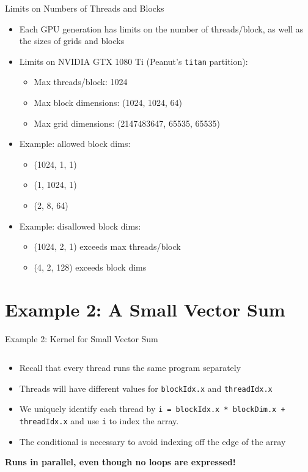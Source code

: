 \documentclass{beamer}
\begin{document}
    \begin{frame}{Limits on Numbers of Threads and Blocks}
        \begin{itemize}
            \item Each GPU generation has limits on the number of threads/block, as well as the sizes of grids and blocks
            \item  Limits on NVIDIA GTX 1080 Ti (Peanut's \texttt{titan} partition):
            \begin{itemize}
                \item Max threads/block: 1024
                \item Max block dimensions:  (1024, 1024, 64)
                \item Max grid dimensions: (2147483647, 65535, 65535)
            \end{itemize}
            \item Example: allowed block dims:
            \begin{itemize}
                \item (1024, 1, 1)
                \item (1, 1024, 1)
                \item (2, 8, 64)
            \end{itemize}
            \item Example: disallowed block dims:
            \begin{itemize}
                \item (1024, 2, 1) exceeds max threads/block
                \item (4, 2, 128) exceeds block dims
            \end{itemize}
        \end{itemize}
    \end{frame}

    \section{Example 2:  A Small Vector Sum}

    \begin{frame}{Example 2:  Kernel for Small Vector Sum}
        \begin{block}{}
            \inputminted[firstline=6,lastline=11]{cuda}{src/02_vector_add.cu}
        \end{block}
        \begin{itemize}
            \item Recall that every thread runs the same program separately
            \item Threads will have different values for \texttt{blockIdx.x} and \texttt{threadIdx.x}
            \item We uniquely identify each thread by \texttt{i = blockIdx.x * blockDim.x + threadIdx.x} and use \texttt{i} to index the array.
            \item The conditional is necessary to avoid indexing off the edge of the array
        \end{itemize}
        \textbf{Runs in parallel, even though no loops are expressed!}
    \end{frame}
\end{document}
